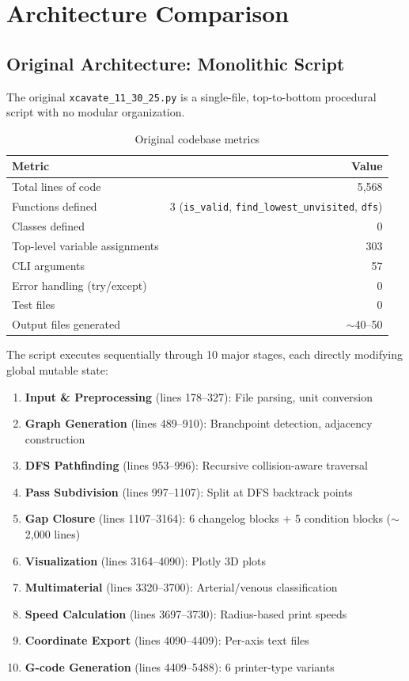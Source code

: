 \documentclass[11pt,a4paper]{article}
\newcommand{\original}{\texttt{xcavate\_11\_30\_25.py}}
\begin{document}
\section{Architecture Comparison}

\subsection{Original Architecture: Monolithic Script}

The original \original{} is a single-file, top-to-bottom procedural script with no modular organization.

\begin{table}[H]
\centering
\caption{Original codebase metrics}
\begin{tabular}{lr}
\toprule
\textbf{Metric} & \textbf{Value} \\
\midrule
Total lines of code & 5,568 \\
Functions defined & 3 (\texttt{is\_valid}, \texttt{find\_lowest\_unvisited}, \texttt{dfs}) \\
Classes defined & 0 \\
Top-level variable assignments & 303 \\
CLI arguments & 57 \\
Error handling (try/except) & 0 \\
Test files & 0 \\
Output files generated & $\sim$40--50 \\
\bottomrule
\end{tabular}
\end{table}

The script executes sequentially through 10 major stages, each directly modifying global mutable state:

\begin{enumerate}[leftmargin=2em]
    \item \textbf{Input \& Preprocessing} (lines 178--327): File parsing, unit conversion
    \item \textbf{Graph Generation} (lines 489--910): Branchpoint detection, adjacency construction
    \item \textbf{DFS Pathfinding} (lines 953--996): Recursive collision-aware traversal
    \item \textbf{Pass Subdivision} (lines 997--1107): Split at DFS backtrack points
    \item \textbf{Gap Closure} (lines 1107--3164): 6 changelog blocks $+$ 5 condition blocks ($\sim$2,000 lines)
    \item \textbf{Visualization} (lines 3164--4090): Plotly 3D plots
    \item \textbf{Multimaterial} (lines 3320--3700): Arterial/venous classification
    \item \textbf{Speed Calculation} (lines 3697--3730): Radius-based print speeds
    \item \textbf{Coordinate Export} (lines 4090--4409): Per-axis text files
    \item \textbf{G-code Generation} (lines 4409--5488): 6 printer-type variants
\end{enumerate}
\end{document}

